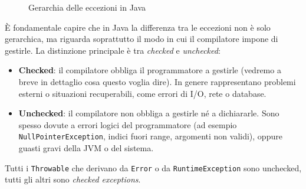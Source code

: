 \begin{figure}[ht]
\caption{Gerarchia delle eccezioni in Java}
\label{fig:eccezioni_vettoriale_uml}
\end{figure}

È fondamentale capire che in Java la differenza tra le eccezioni non è solo gerarchica, ma riguarda soprattutto il modo in cui il compilatore impone di gestirle. La distinzione principale è tra \textit{checked} e \textit{unchecked}:

\begin{itemize}
    \item \textbf{Checked}: il compilatore obbliga il programmatore a gestirle (vedremo a breve in dettaglio cosa questo voglia dire). In genere rappresentano problemi esterni o situazioni recuperabili, come errori di I/O, rete o database.
    
    \item \textbf{Unchecked}: il compilatore non obbliga a gestirle né a dichiararle. Sono spesso dovute a errori logici del programmatore (ad esempio \texttt{NullPointerException}, indici fuori range, argomenti non validi), oppure guasti gravi della JVM o del sistema.
\end{itemize}

\vspace{\baselineskip}

Tutti i \texttt{Throwable} che derivano da \texttt{Error} o da \texttt{RuntimeException} sono unchecked, tutti gli altri sono \textit{checked exceptions}.

\vspace{\baselineskip}


